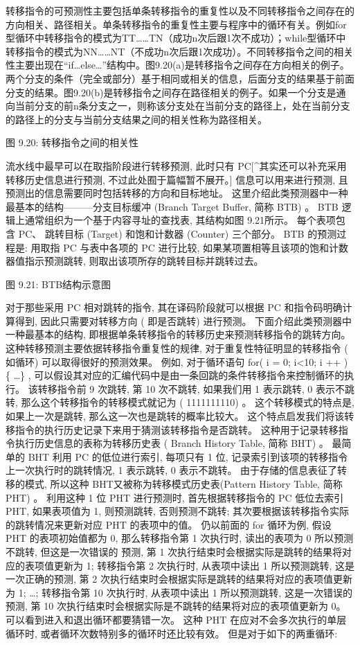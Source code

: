 \documentclass[]{ctexbook}
\begin{document}
转移指令的可预测性主要包括单条转移指令的重复性以及不同转移指令之间存在的方向相关、路径相关。单条转移指令的重复性主要与程序中的循环有关。例如for型循环中转移指令的模式为TT\ldots\ldots TN（成功n次后跟1次不成功）；while型循环中转移指令的模式为NN\ldots\ldots NT（不成功n次后跟1次成功）。不同转移指令之间的相关性主要出现在``if\ldots else\ldots{}''结构中。图9.20(a)是转移指令之间存在方向相关的例子。两个分支的条件（完全或部分）基于相同或相关的信息，后面分支的结果基于前面分支的结果。图9.20(b)是转移指令之间存在路径相关的例子。如果一个分支是通向当前分支的前n条分支之一，则称该分支处在当前分支的路径上，处在当前分支的路径上的分支与当前分支结果之间的相关性称为路径相关。

图 9.20: 转移指令之间的相关性

流水线中最早可以在取指阶段进行转移预测, 此时只有 PC{[}\^{}其实还可以补充采用转移历史信息进行预测, 不过此处囿于篇幅暂不展开。{]} 信息可以用来进行预测, 且预测出的信息需要同时包括转移的方向和目标地址。 这里介绍此类预测器中一种最基本的结构---------分支目标缓冲 (Branch Target Buffer, 简称 BTB) 。 BTB 逻辑上通常组织为一个基于内容寻址的查找表, 其结构如图 9.21所示。 每个表项包含 PC、 跳转目标 (Target) 和饱和计数器 (Counter) 三个部分。 BTB 的预测过程是: 用取指 PC 与表中各项的 PC 进行比较, 如果某项置相等且该项的饱和计数器值指示预测跳转, 则取出该项所存的跳转目标并跳转过去。

图 9.21: BTB结构示意图

对于那些采用 PC 相对跳转的指令, 其在译码阶段就可以根据 PC 和指令码明确计算得到, 因此只需要对转移方向 ( 即是否跳转) 进行预测。 下面介绍此类预测器中一种最基本的结构, 即根据单条转移指令的转移历史来预测转移指令的跳转方向。 这种转移预测主要依据转移指令重复性的规律, 对于重复性特征明显的转移指令 ( 如循环) 可以取得很好的预测效果。 例如, 对于循环语句 for( i = 0; i\textless10; i ++ ) \{ \ldots\} , 可以假设其对应的汇编代码中是由一条回跳的条件转移指令来控制循环的执行。 该转移指令前 9 次跳转, 第 10 次不跳转, 如果我们用 1 表示跳转, 0 表示不跳转, 那么这个转移指令的转移模式就记为 ( 1111111110) 。 这个转移模式的特点是, 如果上一次是跳转, 那么这一次也是跳转的概率比较大。 这个特点启发我们将该转移指令的执行历史记录下来用于猜测该转移指令是否跳转。 这种用于记录转移指令执行历史信息的表称为转移历史表 ( Branch History Table, 简称 BHT) 。 最简单的 BHT 利用 PC 的低位进行索引, 每项只有 1 位, 记录索引到该项的转移指令上一次执行时的跳转情况, 1 表示跳转, 0 表示不跳转。 由于存储的信息表征了转移的模式, 所以这种 BHT又被称为转移模式历史表(Pattern History Table, 简称 PHT) 。 利用这种 1 位 PHT 进行预测时, 首先根据转移指令的 PC 低位去索引 PHT, 如果表项值为 1, 则预测跳转, 否则预测不跳转; 其次要根据该转移指令实际的跳转情况来更新对应 PHT 的表项中的值。 仍以前面的 for 循环为例, 假设 PHT 的表项初始值都为 0, 那么转移指令第 1 次执行时, 读出的表项为 0 所以预测不跳转, 但这是一次错误的 预测, 第 1 次执行结束时会根据实际是跳转的结果将对应的表项值更新为 1; 转移指令第 2 次执行时, 从表项中读出 1 所以预测跳转, 这是一次正确的预测, 第 2 次执行结束时会根据实际是跳转的结果将对应的表项值更新为 1; \ldots; 转移指令第 10 次执行时, 从表项中读出 1 所以预测跳转, 这是一次错误的预测, 第 10 次执行结束时会根据实际是不跳转的结果将对应的表项值更新为 0。 可以看到进入和退出循环都要猜错一次。 这种 PHT 在应对不会多次执行的单层循环时, 或者循环次数特别多的循环时还比较有效。 但是对于如下的两重循环:
\end{document}
